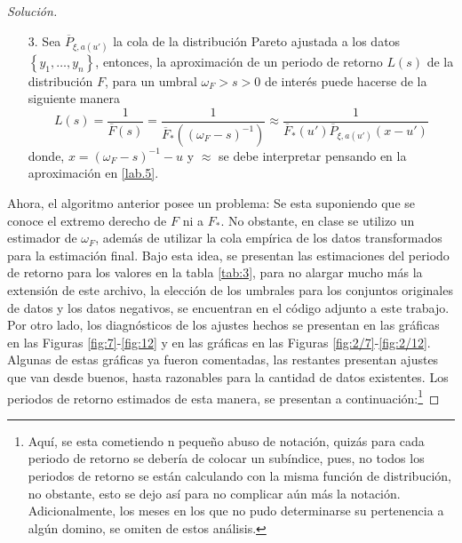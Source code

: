 \documentclass[10.5pt,notitlepage]{article}
\newenvironment{solucion}
  {\begin{proof}[Solución]}
  {\end{proof}}
\newcommand{\kis}[1]{\left\{ #1 \right\}}
\theoremstyle{plain}
\begin{document}
\begin{solucion}
\begin{itemize}
    \item[3.] Sea \(\overline{P}_{\xi,a(u')}\) la cola de la distribución Pareto ajustada a los datos \(\kis{y_1, \hdots ,y_n}\), entonces, la aproximación de un periodo de retorno \(L(s)\) de la distribución \(F\), para un umbral \(\omega_{F}>s > 0\) de interés puede hacerse de la siguiente manera
    \[
    L(s) = \frac{1}{\overline{F}(s)} = \frac{1}{\overline{F}_{*}((\omega_{F}- s)^{-1 })} \approx \frac{1}{\overline{F}_{*}(u')\overline{P}_{\xi,a(u')}(x - u')} 
     \]
     donde, \(x = (\omega_{F}- s)^{-1 } - u\) y \(\approx\) se debe interpretar pensando en la aproximación en \eqref{lab.5}.  
\end{itemize}
Ahora, el algoritmo anterior posee un problema: Se esta suponiendo que se conoce el extremo derecho de \(F\) ni a \(F_{*}\). No obstante, en clase se utilizo un estimador de \(\omega_{F}\), además de utilizar la cola empírica de los datos transformados para la estimación final. Bajo esta idea, se presentan las estimaciones del periodo de retorno para los valores en la tabla \ref{tab:3}, para no alargar mucho más la extensión de este archivo, la elección de los umbrales para los conjuntos originales de datos y los datos negativos, se encuentran en el código adjunto a este trabajo. Por otro lado, los diagnósticos de los ajustes hechos se presentan en las gráficas en las Figuras \ref{fig:7}-\ref{fig:12} y en las gráficas en las Figuras \ref{fig:2/7}-\ref{fig:2/12}. Algunas de estas gráficas ya fueron comentadas, las restantes presentan ajustes que van desde buenos, hasta razonables para la cantidad de datos existentes. Los periodos de retorno estimados de esta manera, se presentan a continuación:\footnote{Aquí, se esta cometiendo n pequeño abuso de notación, quizás para cada periodo de retorno se debería de colocar un subíndice, pues, no todos los periodos de retorno se están calculando con la misma función de distribución, no obstante, esto se dejo así para no complicar aún más la notación. Adicionalmente, los meses en los que no pudo determinarse su pertenencia a algún domino, se omiten de estos análisis. }
\begin{table}[H]
        \centering
\end{table}
\end{solucion}
\end{document}
